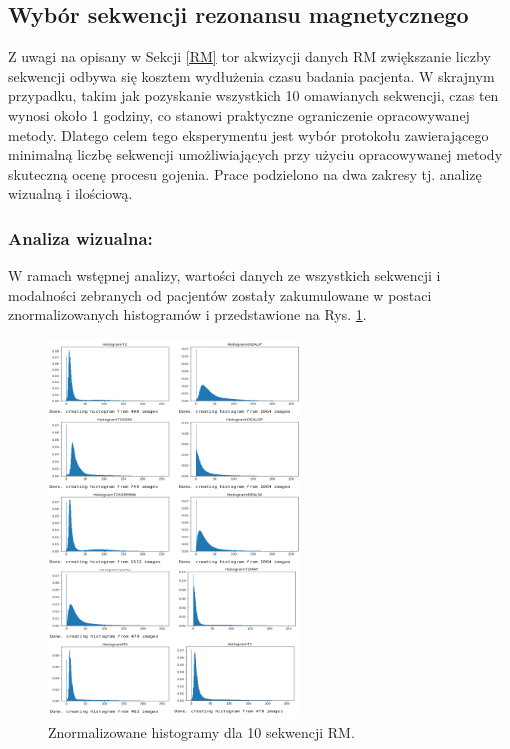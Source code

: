\subsection{Wybór sekwencji rezonansu magnetycznego}
\label{seq:protocol_selection}
Z uwagi na opisany w Sekcji \ref{RM} tor akwizycji danych RM zwiększanie liczby sekwencji odbywa się kosztem wydłużenia czasu badania pacjenta. W skrajnym przypadku, takim jak pozyskanie wszystkich 10 omawianych sekwencji, czas ten wynosi około 1 godziny, co stanowi praktyczne ograniczenie opracowywanej metody. Dlatego celem tego eksperymentu jest wybór protokołu zawierającego minimalną liczbę sekwencji umożliwiających przy użyciu opracowywanej metody skuteczną ocenę procesu gojenia. Prace podzielono na dwa zakresy tj. analizę wizualną i ilościową.

\subsubsection{Analiza wizualna:} W ramach wstępnej analizy, wartości danych ze wszystkich sekwencji i modalności zebranych od pacjentów zostały zakumulowane w postaci znormalizowanych histogramów i przedstawione na Rys. \ref{fig:Hists}.

\begin{figure}[h]
	\centering
	\includegraphics[width=0.6\textwidth]{figures/Hists.png}
	\caption{Znormalizowane histogramy dla 10 sekwencji RM.}\label{fig:Hists}
\end{figure}

